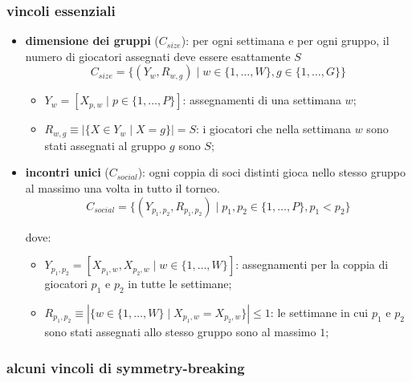 \documentclass[12pt]{article}
\begin{document}
\subsubsection*{vincoli essenziali}
    \begin{itemize}
        \item \textbf{dimensione dei gruppi} ($C_{size}$): per ogni settimana e per ogni gruppo, il numero di giocatori assegnati deve essere esattamente $S$
$$C_{size} = \{ (Y_w, R_{w,g}) \mid w \in \{1, \dots, W\}, g \in \{1, \dots, G\} \}$$

\begin{itemize}
    \item $Y_w = [X_{p,w} \mid p \in \{1, \dots, P\} ]$: assegnamenti di una settimana $w$;
    \item $R_{w,g} \equiv \left| \{ X \in Y_w \mid X = g \} \right| = S$: i giocatori che nella settimana $w$ sono stati assegnati al gruppo $g$ sono $S$;
\end{itemize}

\item \textbf{incontri unici} ($C_{social}$): ogni coppia di soci distinti gioca nello stesso gruppo al massimo una volta in tutto il torneo.
$$C_{social} = \{ (Y_{p_1, p_2}, R_{p_1, p_2}) \mid p_1, p_2 \in \{1, \dots, P\}, p_1 < p_2 \}$$

dove:
\begin{itemize}
    \item $Y_{p_1, p_2} = [ X_{p_1,w}, X_{p_2,w} \mid w \in \{1, \dots, W\} ]$: assegnamenti per la coppia di giocatori $p_1$ e $p_2$ in tutte le settimane;
    \item $R_{p_1, p_2} \equiv \left| \{ w \in \{1, \dots, W\} \mid X_{p_1,w} = X_{p_2,w} \} \right| \le 1$: le settimane in cui $p_1$ e $p_2$ sono stati assegnati allo stesso gruppo sono al massimo $1$;
\end{itemize}
        
    \end{itemize}

    \subsubsection*{alcuni vincoli di symmetry-breaking}
        
\end{document}
